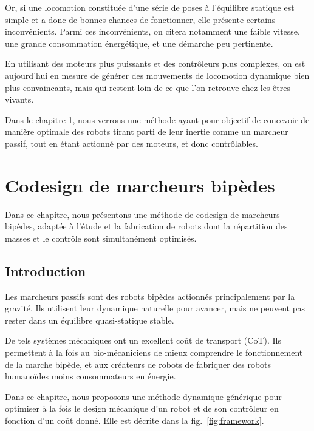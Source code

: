 \documentclass[french,A4paper,]{book}
\begin{document}
Or, si une locomotion constituée d'une série de poses à l'équilibre
statique est simple et a donc de bonnes chances de fonctionner, elle
présente certains inconvénients. Parmi ces inconvénients, on citera
notamment une faible vitesse, une grande consommation énergétique, et
une démarche peu pertinente.

En utilisant des moteurs plus puissants et des contrôleurs plus
complexes, on est aujourd'hui en mesure de générer des mouvements de
locomotion dynamique bien plus convaincants, mais qui restent loin de ce
que l'on retrouve chez les êtres vivants.

Dans le chapitre \ref{sec:yoyoman}, nous verrons une méthode ayant pour
objectif de concevoir de manière optimale des robots tirant parti de
leur inertie comme un marcheur passif, tout en étant actionné par des
moteurs, et donc contrôlables.

\renewcommand{\thefigure}{\Alph{chapter}-\arabic{figure}}
\renewcommand{\thetable}{\Alph{chapter}-\arabic{table}}
\renewcommand{\thealgorithm}{\Alph{chapter}-\arabic{algorithm}}

\chapter{Codesign de marcheurs bipèdes}\label{sec:yoyoman}

Dans ce chapitre, nous présentons une méthode de codesign de marcheurs
bipèdes, adaptée à l'étude et la fabrication de robots dont la
répartition des masses et le contrôle sont simultanément optimisés.

\section{Introduction}\label{introduction-1}

Les marcheurs passifs sont des robots bipèdes actionnés principalement
par la gravité. Ils utilisent leur dynamique naturelle pour avancer,
mais ne peuvent pas rester dans un équilibre quasi-statique stable.

De tels systèmes mécaniques ont un excellent coût de transport (CoT).
Ils permettent à la fois au bio-mécaniciens de mieux comprendre le
fonctionnement de la marche bipède, et aux créateurs de robots de
fabriquer des robots humanoïdes moins consommateurs en énergie.

Dans ce chapitre, nous proposons une méthode dynamique générique pour
optimiser à la fois le design mécanique d'un robot et de son contrôleur
en fonction d'un coût donné. Elle est décrite dans la
fig.~\ref{fig:framework}.
\end{document}
